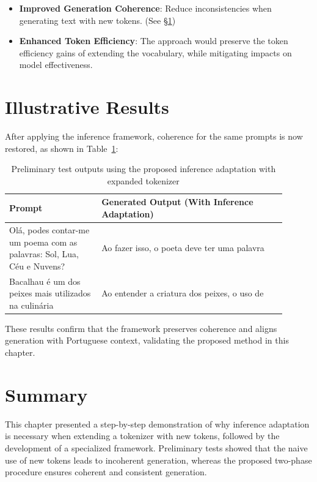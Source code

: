 \begin{itemize}
    \item \textbf{Improved Generation Coherence}: Reduce inconsistencies when generating text with new tokens. (See \S\ref{sec:results_new_inference})
 
    \item \textbf{Enhanced Token Efficiency}: The approach would preserve the token efficiency
gains of extending the vocabulary, while mitigating impacts on model effectiveness.

\end{itemize}

\section{Illustrative Results}
\label{sec:results_new_inference}
After applying the inference framework, coherence for the same prompts is now restored, as shown in Table~\ref{tab:adapted-inference-results}:

\begin{table}[H]
    \centering
    \begin{tabular}{|p{0.3\linewidth}|p{0.6\linewidth}|}
        \hline
        \textbf{Prompt} & \textbf{Generated Output (With Inference Adaptation)} \\
        \hline
        Olá, podes contar-me um poema com as palavras: Sol, Lua, Céu e Nuvens? & Ao fazer isso, o poeta deve ter uma palavra \\
        \hline
        Bacalhau é um dos peixes mais utilizados na culinária & Ao entender a criatura dos peixes, o uso de \\
        \hline
    \end{tabular}
    \caption{Preliminary test outputs using the proposed inference adaptation with expanded tokenizer}
    \label{tab:adapted-inference-results}
\end{table}

These results confirm that the framework preserves coherence and aligns generation with Portuguese context, validating the proposed method in this chapter.

\section{Summary}
This chapter presented a step-by-step demonstration of why inference adaptation is necessary when extending a tokenizer with new tokens, followed by the development of a specialized framework. Preliminary tests showed that the naive use of new tokens leads to incoherent generation, whereas the proposed two-phase procedure ensures coherent and consistent generation.
